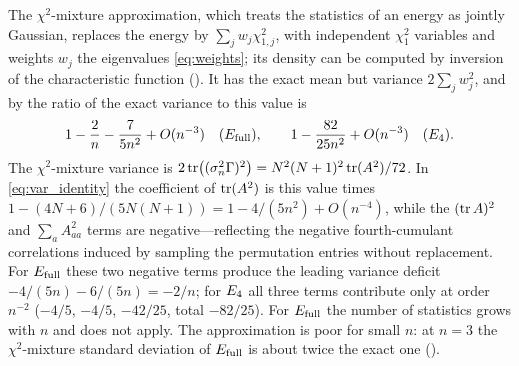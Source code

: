 \begin{remark}
\label{rem:gauss_mixture}
The $\chi^2$-mixture approximation, which treats the statistics of an energy as jointly Gaussian, replaces the energy by $\sum_jw_j\chi^2_{1,j}$, with independent $\chi^2_1$ variables and weights $w_j$ the eigenvalues \eqref{eq:weights}; its density can be computed by inversion of the characteristic function \cite{imhof1961} ().
It has the exact mean but variance $2\sum_jw_j^2$, and by  the ratio of the exact variance to this value is
\[
1-\frac2n-\frac{7}{5n^2}+O(n^{-3})\quad(E_{\mathrm{full}}),\qquad 1-\frac{82}{25n^2}+O(n^{-3})\quad(E_4).
\]
The $\chi^2$-mixture variance is $2\operatorname{tr}\bigl((\sigma_n^2\Gamma)^2\bigr)=N^2(N+1)^2\operatorname{tr}(A^2)/72$.
In \eqref{eq:var_identity} the coefficient of $\operatorname{tr}(A^2)$ is this value times $1-(4N+6)/(5N(N+1))=1-4/(5n^2)+O(n^{-4})$, while the $(\operatorname{tr} A)^2$ and $\sum_aA_{aa}^2$ terms are negative—reflecting the negative fourth-cumulant correlations induced by sampling the permutation entries without replacement.
For $E_{\mathrm{full}}$ these two negative terms produce the leading variance deficit $-4/(5n)-6/(5n)=-2/n$; for $E_4$ all three terms contribute only at order $n^{-2}$ ($-4/5$, $-4/5$, $-42/25$, total $-82/25$).
For $E_{\mathrm{full}}$ the number of statistics grows with $n$ and  does not apply.
The approximation is poor for small $n$: at $n=3$ the $\chi^2$-mixture standard deviation of $E_{\mathrm{full}}$ is about twice the exact one ().
\end{remark}

